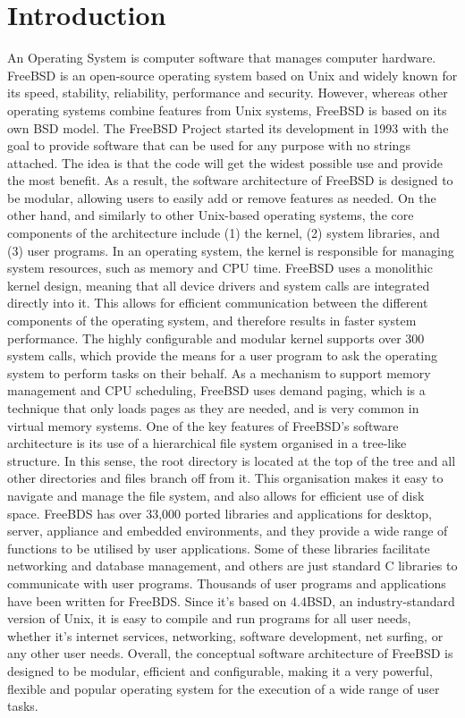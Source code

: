 \documentclass[12pt, dvipsnames, a4paper]{article}
\begin{document}
\section{Introduction}
An Operating System is computer software that manages computer hardware. FreeBSD is an open-source operating system based on Unix and widely known for its speed, stability, reliability, performance and security. However, whereas other operating systems combine features from Unix systems, FreeBSD is based on its own BSD model.
The FreeBSD Project started its development in 1993 with the goal to provide software that can be used for any purpose with no strings attached. The idea is that the code will get the widest possible use and provide the most benefit. As a result, the software architecture of FreeBSD is designed to be modular, allowing users to easily add or remove features as needed. On the other hand, and similarly to other Unix-based operating systems, the core components of the architecture include (1) the kernel, (2) system libraries, and (3) user programs.
In an operating system, the kernel is responsible for managing system resources, such as memory and CPU time. FreeBSD uses a monolithic kernel design, meaning that all device drivers and system calls are integrated directly into it. This allows for efficient communication between the different components of the operating system, and therefore results in faster system performance. The highly configurable and modular kernel supports over 300 system calls, which provide the means for a user program to ask the operating system to perform tasks on their behalf. As a mechanism to support memory management and CPU scheduling, FreeBSD uses demand paging, which is a technique that only loads pages as they are needed, and is very common in virtual memory systems.
One of the key features of FreeBSD's software architecture is its use of a hierarchical file system organised in a tree-like structure. In this sense, the root directory is located at the top of the tree and all other directories and files branch off from it. This organisation makes it easy to navigate and manage the file system, and also allows for efficient use of disk space.
FreeBDS has over 33,000 ported libraries and applications for desktop, server, appliance and embedded environments, and they provide a wide range of functions to be utilised by user applications. Some of these libraries facilitate networking and database management, and others are just standard C libraries to communicate with user programs.
Thousands of user programs and applications have been written for FreeBDS. Since it’s based on 4.4BSD, an industry-standard version of Unix, it is easy to compile and run programs for all user needs, whether it’s internet services, networking, software development, net surfing, or any other user needs.
Overall, the conceptual software architecture of FreeBSD is designed to be modular, efficient and configurable, making it a very powerful, flexible and popular operating system for the execution of a wide range of user tasks.
\end{document}
